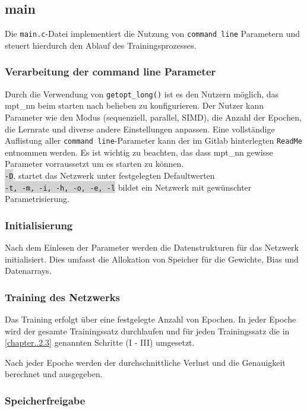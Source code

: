 \documentclass[a4paper, 12pt]{article}
\newcommand{\option}[1]{\colorbox{lightgray}{\texttt{#1}}}
\begin{document}
\subsection{main}
\label{subsec:main}

Die \texttt{main.c}-Datei implementiert die Nutzung von \texttt{command line} Parametern und steuert hierdurch den Ablauf des Trainingsprozesses.

\subsubsection{Verarbeitung der command line Parameter}

Durch die Verwendung von \texttt{getopt\_long()} ist es den Nutzern möglich, das mpt\_nn beim starten nach belieben zu konfigurieren. 
Der Nutzer kann Parameter wie den Modus (sequenziell, parallel, SIMD), die Anzahl der Epochen, die Lernrate und diverse andere Einstellungen anpassen.
Eine vollständige Auflistung aller \texttt{command line}-Parameter kann der im Gitlab hinterlegten \texttt{ReadMe} entnommen werden.
Es ist wichtig zu beachten, das dass mpt\_nn gewisse Parameter vorraussetzt um es starten zu können.\\
\option{-D}, startet das Netzwerk unter festgelegten Defaultwerten \\
\option{-t, -m, -i, -h, -o, -e, -l} bildet ein Netzwerk mit gewünschter Parametrisierung.

\subsubsection{Initialisierung}

Nach dem Einlesen der Parameter werden die Datenstrukturen für das Netzwerk initialisiert. Dies umfasst die Allokation von Speicher für die Gewichte, Bias und Datenarrays.

\subsubsection{Training des Netzwerks}

Das Training erfolgt über eine festgelegte Anzahl von Epochen. In jeder Epoche wird der gesamte 
Trainingssatz durchlaufen und für jeden Trainingssatz die in \autoref{chapter..2.3} genannten
Schritte (I - III) umgesetzt.

Nach jeder Epoche werden der durchschnittliche Verlust und die Genauigkeit berechnet und ausgegeben.

\subsubsection{Speicherfreigabe}
\end{document}

